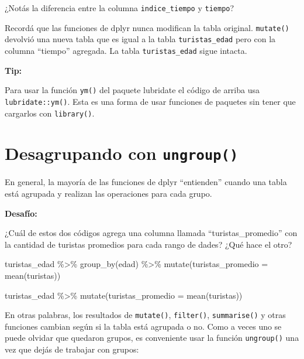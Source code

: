 \documentclass[
  openany]{book}
\newenvironment{Shaded}{\begin{snugshade}}{\end{snugshade}}
\newcommand{\AttributeTok}[1]{\textcolor[rgb]{0.77,0.63,0.00}{#1}}
\newcommand{\FunctionTok}[1]{\textcolor[rgb]{0.00,0.00,0.00}{#1}}
\newcommand{\NormalTok}[1]{#1}
\newcommand{\SpecialCharTok}[1]{\textcolor[rgb]{0.00,0.00,0.00}{#1}}
\begin{document}
¿Notás la diferencia entre la columna \texttt{indice\_tiempo} y \texttt{tiempo}?

Recordá que las funciones de dplyr nunca modifican la tabla original.
\texttt{mutate()} devolvió una nueva tabla que es igual a la tabla \texttt{turistas\_edad} pero con la columna ``tiempo'' agregada.
La tabla \texttt{turistas\_edad} sigue intacta.

\textbf{Tip:}

Para usar la función \texttt{ym()} del paquete lubridate el código de arriba usa \texttt{lubridate::ym()}.
Esta es una forma de usar funciones de paquetes sin tener que cargarlos con \texttt{library()}.

\hypertarget{desagrupando-con-ungroup}{%
\section{\texorpdfstring{Desagrupando con \texttt{ungroup()}}{Desagrupando con ungroup()}}\label{desagrupando-con-ungroup}}

En general, la mayoría de las funciones de dplyr ``entienden'' cuando una tabla está agrupada y realizan las operaciones para cada grupo.

\textbf{Desafío:}

¿Cuál de estos dos códigos agrega una columna llamada ``turistas\_promedio'' con la cantidad de turistas promedios para cada rango de dades?
¿Qué hace el otro?

\begin{Shaded}
\begin{Highlighting}[]
\NormalTok{turistas\_edad }\SpecialCharTok{\%\textgreater{}\%} 
  \FunctionTok{group\_by}\NormalTok{(edad) }\SpecialCharTok{\%\textgreater{}\%} 
  \FunctionTok{mutate}\NormalTok{(}\AttributeTok{turistas\_promedio =} \FunctionTok{mean}\NormalTok{(turistas)) }

\NormalTok{turistas\_edad }\SpecialCharTok{\%\textgreater{}\%} 
  \FunctionTok{mutate}\NormalTok{(}\AttributeTok{turistas\_promedio =} \FunctionTok{mean}\NormalTok{(turistas)) }
\end{Highlighting}
\end{Shaded}

En otras palabras, los resultados de \texttt{mutate()}, \texttt{filter()}, \texttt{summarise()} y otras funciones cambian según si la tabla está agrupada o no.
Como a veces uno se puede olvidar que quedaron grupos, es conveniente usar la función \texttt{ungroup()} una vez que dejás de trabajar con grupos:
\end{document}
